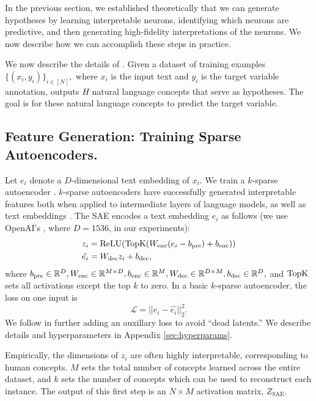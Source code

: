 In the previous section, we established theoretically that we can generate hypotheses by learning interpretable neurons, identifying which neurons are predictive, and then generating high-fidelity interpretations of the neurons. We now describe how we can accomplish these steps in practice.

We now describe the details of \ourmethod. Given a dataset of training examples $\{(x_i, y_i)\}_{i\in [N]},$ where $x_i$ is the input text and $y_i$ is the target variable annotation, \ourmethod outputs $H$ natural language concepts that serve as hypotheses. The goal is for these natural language concepts to predict the target variable.

\subsection{Feature Generation: Training Sparse Autoencoders.}

Let $e_i$ denote a $D$-dimensional text embedding of $x_i$. We train a $k$-sparse autoencoder \citep{makhzani_ksparse_2014}. $k$-sparse autoencoders have successfully generated interpretable features both when applied to intermediate layers of language models, as well as text embeddings \citep{gao_scaling_2024, oneill_disentangling_2024}. The SAE encodes a text embedding $e_i$ as follows (we use OpenAI's \embeddingmodel, where $D=1536$, in our experiments):
\begin{align}
    z_i &= \operatorname{ReLU}(\operatorname{TopK}(W_{\operatorname{enc}}(e_i - b_{\mathrm{pre}}) + b_{\operatorname{enc}}))\\
    \hat{e_i} &= W_{\operatorname{dec}}z_i + b_{\operatorname{dec}},
\end{align}
where $b_{\mathrm{pre}} \in \mathbb{R}^D, W_{\operatorname{enc}}\in \mathbb{R}^{M\times D}, b_{\operatorname{enc}}\in \mathbb{R}^{M}, W_{\operatorname{dec}}\in \mathbb{R}^{D\times M}, b_{\operatorname{dec}}\in \mathbb{R}^{D},$ and $\operatorname{TopK}$ sets all activations except the top $k$ to zero. In a basic $k$-sparse autoencoder, the loss on one input is
\begin{equation}
\mathcal{L} = ||e_i - \hat{e_i}||_2^2.
\end{equation}
We follow \citet{gao_scaling_2024, oneill_disentangling_2024} in further adding an auxillary loss to avoid ``dead latents.'' We describe details and hyperparameters in Appendix \ref{sec:hyperparams}. 

Empirically, the dimensions of $z_i$ are often highly interpretable, corresponding to human concepts.
$M$ sets the total number of concepts learned across the entire dataset, and $k$ sets the number of concepts which can be used to reconstruct each instance. The output of this first step is an $N\times M$ activation matrix, $Z_{\text{SAE}}$.


